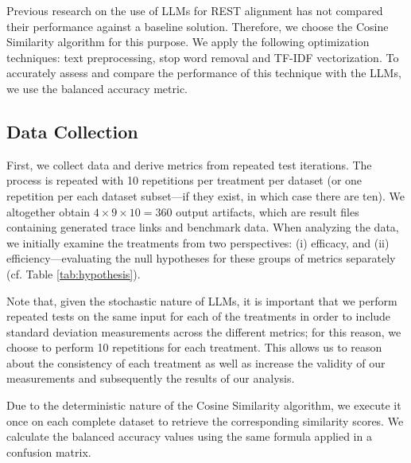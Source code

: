 Previous research on the use of LLMs for REST alignment has not compared their performance against a baseline solution. Therefore, we choose the Cosine Similarity algorithm for this purpose. We apply the following optimization techniques: text preprocessing, stop word removal and TF-IDF vectorization. To accurately assess and compare the performance of this technique with the LLMs, we use the balanced accuracy metric.

\subsection{Data Collection}\label{sec:data-collection}

First, we collect data and derive metrics from repeated test iterations. The process is repeated with 10 repetitions per treatment per dataset (or one repetition per each dataset subset---if they exist, in which case there are ten). We altogether obtain $4 \times 9 \times 10 = 360$ output artifacts, which are result files containing generated trace links and benchmark data. When analyzing the data, we initially examine the treatments from two perspectives: (i) efficacy, and (ii) efficiency---evaluating the null hypotheses for these groups of metrics separately (cf. Table \ref{tab:hypothesis}).

Note that, given the stochastic nature of LLMs, it is important that we perform repeated tests on the same input for each of the treatments in order to include standard deviation measurements across the different metrics; for this reason, we choose to perform 10 repetitions for each treatment. This allows us to reason about the consistency of each treatment as well as increase the validity of our measurements and subsequently the results of our analysis.

Due to the deterministic nature of the Cosine Similarity algorithm, we execute it once on each complete dataset to retrieve the corresponding similarity scores. We calculate the balanced accuracy values using the same formula applied in a confusion matrix.



